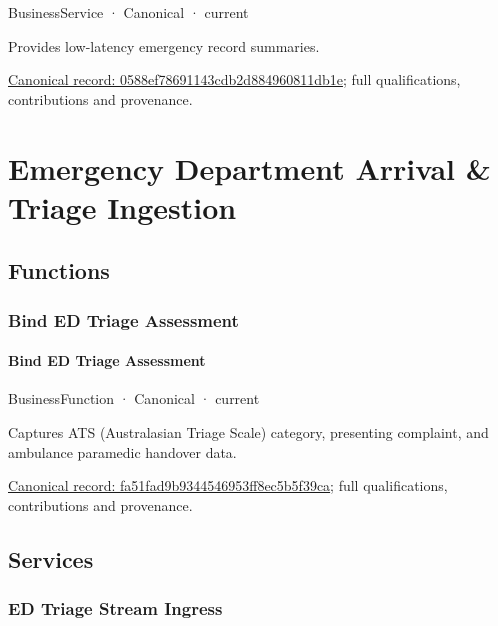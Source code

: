\label{element:0588ef78691143cdb2d884960811db1e}
{\small BusinessService · Canonical · current}\par

Provides low-latency emergency record summaries.


{\footnotesize \href{../../../../continuum/business/business-service/0588ef78691143cdb2d884960811db1e.md}{Canonical record: 0588ef78691143cdb2d884960811db1e}; full qualifications, contributions and provenance.}\par
\section{Emergency Department Arrival \& Triage Ingestion}

\subsection{Functions}

\subsubsection{Bind ED Triage Assessment}

\paragraph{Bind ED Triage Assessment}

\label{element:fa51fad9b9344546953ff8ec5b5f39ca}
{\small BusinessFunction · Canonical · current}\par

Captures ATS (Australasian Triage Scale) category, presenting complaint, and ambulance paramedic handover data.


{\footnotesize \href{../../../../continuum/business/business-function/fa51fad9b9344546953ff8ec5b5f39ca.md}{Canonical record: fa51fad9b9344546953ff8ec5b5f39ca}; full qualifications, contributions and provenance.}\par
\subsection{Services}

\subsubsection{ED Triage Stream Ingress}

